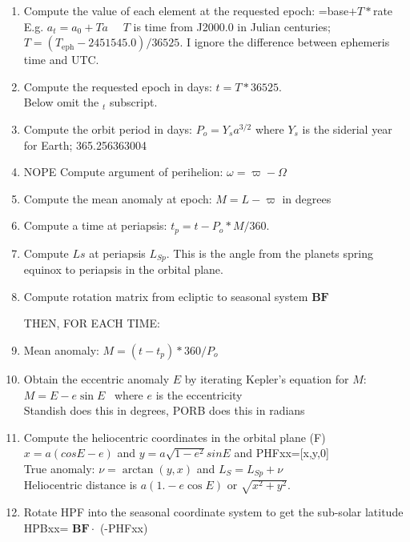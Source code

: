 \documentclass[draft]{article}
\newcommand{\qi}{\\ \hspace*{2.em}}      %
\newcommand{\qii}{\\ \hspace*{4.em}}     %
\newcommand{\qiii}{\\ \hspace*{6.em}}    %
\newcommand{\qdp}{$. \! ^\circ \! $} %
\begin{document}
\begin{enumerate}    %
\item  Compute the value of each element at the requested epoch: =base$+T\ast$rate
\qii E.g. $a_t=a_0+ T\dot{a}$  \ \ $T$ is time from J2000.0 in Julian centuries;
\qii  $T=\left( T_\mathrm{eph}-2451545.0 \right)/36525. $ I ignore the difference between ephemeris time and UTC. 
\item Compute the requested epoch in days: $ t=T*36525.$
\qi Below omit the $_t$ subscript.
\item Compute the orbit period in days: $P_o= Y_s a^{3/2}$ where $Y_s$ is the siderial year for Earth; 365.256363004
\item NOPE Compute argument of perihelion: $ \omega=\varpi-\Omega$
\item Compute the mean anomaly at epoch: $M=L-\varpi $ in degrees
\item Compute a time at periapsis: $t_p=   t-P_o*M/360.$
\item Compute $Ls$ at periapsis $L_{Sp}$. This is the angle from the planets spring equinox to periapsis in the orbital plane.
\item Compute rotation matrix from ecliptic to seasonal system $\mathbf{BF}$

 THEN, FOR EACH TIME:

\item Mean anomaly: $  M=(t-t_p)* 360/P_o $
\item Obtain the eccentric anomaly $E$ by iterating Kepler's equation for $M$:
\qiii $M= E- e \sin E $ \ where $e$ is the eccentricity
\qi Standish does this in degrees, PORB does this in radians
\item Compute the heliocentric coordinates in the orbital plane (F)
\qi $x =a(cos E-e)$ and $ y=a \sqrt{1-e^2} sin E$ and PHFxx=[x,y,0]
\qi True anomaly: $ \nu =\arctan (y,x)$ and $L_S = L_{Sp}+\nu $
\qi Heliocentric distance is $a( 1.-e \cos E )$ or $\sqrt{x^2 + y^2}$.
\item Rotate HPF into the seasonal coordinate system to get the sub-solar latitude
\qi HPBxx= $\mathbf{BF} \cdot $ (-PHFxx)


\end{enumerate}
\end{document}
